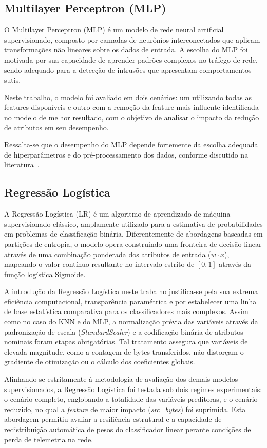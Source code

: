 \subsection{Multilayer Perceptron (MLP)}
O Multilayer Perceptron (MLP) é um modelo de rede neural artificial supervisionado,
composto por camadas de neurônios interconectados que aplicam transformações não lineares
sobre os dados de entrada. A escolha do MLP foi motivada por sua capacidade de aprender
padrões complexos no tráfego de rede, sendo adequado para a detecção de intrusões que
apresentam comportamentos sutis. 

Neste trabalho, o modelo foi avaliado em dois cenários:
um utilizando todas as features disponíveis e outro com a remoção da feature mais
influente identificada no modelo de melhor resultado, com o objetivo de analisar o impacto da
redução de atributos em seu desempenho. 

Ressalta-se que o desempenho do MLP depende
fortemente da escolha adequada de hiperparâmetros e do pré-processamento dos dados,
conforme discutido na literatura~\cite{haykin_neural_networks}.

\subsection{Regressão Logística}
A Regressão Logística (LR) é um algoritmo de aprendizado de máquina supervisionado clássico,
amplamente utilizado para a estimativa de probabilidades em problemas de classificação binária.
Diferentemente de abordagens baseadas em partições de entropia, o modelo opera construindo uma fronteira
de decisão linear através de uma combinação ponderada dos atributos de entrada ($w \cdot x$),
mapeando o valor contínuo resultante no intervalo estrito de $[0, 1]$ através da função logística Sigmoide.

A introdução da Regressão Logística neste trabalho justifica-se pela sua extrema eficiência computacional,
transparência paramétrica e por estabelecer uma linha de base estatística comparativa para os classificadores mais complexos.
Assim como no caso do KNN e do MLP, a normalização prévia das variáveis através da padronização de escala
(\textit{StandardScaler}) e a codificação binária de atributos nominais foram etapas obrigatórias. Tal tratamento
assegura que variáveis de elevada magnitude, como a contagem de bytes transferidos, não distorçam o gradiente de
otimização ou o cálculo dos coeficientes globais.

Alinhando-se estritamente à metodologia de avaliação dos demais modelos supervisionados, a Regressão Logística foi
testada sob dois regimes experimentais: o cenário completo, englobando a totalidade das variáveis preditoras, e o
cenário reduzido, no qual a \textit{feature} de maior impacto (\textit{src\_bytes}) foi suprimida. Esta abordagem permitiu
avaliar a resiliência estrutural e a capacidade de redistribuição automática de pesos do classificador linear perante
condições de perda de telemetria na rede.
